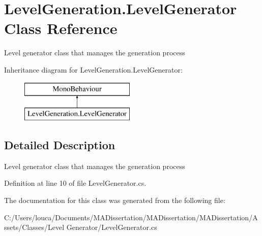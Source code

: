 \hypertarget{class_level_generation_1_1_level_generator}{}\section{Level\+Generation.\+Level\+Generator Class Reference}
\label{class_level_generation_1_1_level_generator}


Level generator class that manages the generation process  


Inheritance diagram for Level\+Generation.\+Level\+Generator\+:\begin{figure}[H]
\begin{center}
\leavevmode
\includegraphics[height=2.000000cm]{class_level_generation_1_1_level_generator}
\end{center}
\end{figure}


\subsection{Detailed Description}
Level generator class that manages the generation process 



Definition at line 10 of file Level\+Generator.\+cs.



The documentation for this class was generated from the following file\+:\begin{DoxyCompactItemize}
\item 
C\+:/\+Users/louca/\+Documents/\+M\+A\+Dissertation/\+M\+A\+Dissertation/\+M\+A\+Dissertation/\+Assets/\+Classes/\+Level Generator/Level\+Generator.\+cs\end{DoxyCompactItemize}
